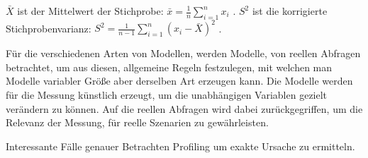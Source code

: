 \begin{equation*}
    [\bar{X} - t_{n-1,1-\alpha/2}\sqrt{S^2/n}, \bar{X} + t_{n-1,1-\alpha/2}\sqrt{S^2/n}]
\end{equation*}

$\bar{X}$ ist der Mittelwert der Stichprobe: $\bar{x} = \frac{1}{n}
\displaystyle\sum^{n}_{i=1}x_i$ \autocite[vgl.][S.59]{Statistik}.
$S^2$ ist die korrigierte Stichprobenvarianz: $S^2 =
\frac{1}{n-1}\displaystyle\sum^{n}_{i=1}(x_i-\bar{X})^2$ \autocite[vgl.][S.507]{Statistik}.

Für die verschiedenen Arten von Modellen, werden Modelle, von reellen Abfragen
betrachtet, um aus diesen, allgemeine Regeln festzulegen, mit welchen man
Modelle variabler Größe aber derselben Art erzeugen kann. Die Modelle werden
für die Messung künstlich erzeugt, um die unabhängigen Variablen gezielt
verändern zu können. Auf die reellen Abfragen wird dabei zurückgegriffen, um
die Relevanz der Messung, für reelle Szenarien zu gewährleisten.
\autocite[Vgl.][S.500f]{ExperimentalAnalysis}



Interessante Fälle genauer Betrachten Profiling um exakte Ursache zu ermitteln.

